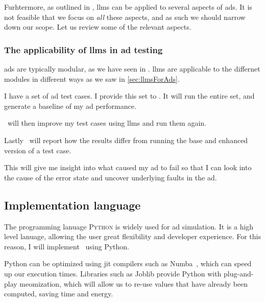 Furhtermore, as outlined in \citeauthor{LLM4AD}, \acrlong{llms} can be applied to several aspects
of \acrlong{ads}. It is not feasible that we focus on \textit{all} these aspects, and as such we
should narrow down our scope. Let us review some of the relevant aspects.

\subsubsection*{The applicability of \acrshort{llms} in \acrshort{ad} testing}

\acrlong{ads} are typically modular, as we have seen in .
\acrshort{llms} are applicable to the differnet modules in different ways as we saw in \cref{sec:llmsForAds}.

\begin{tcolorbox}[colback=gray!5!white,colframe=gray!75!black,title=User history
        of using \hefe]\label{user-history}
    I have a set of \acrfull{ad} test cases. I provide this set to \hefe. It will run the entire
    set, and generate a baseline of my \acrshort{ad} performance.

    \hefe~will then improve my test cases using \acrlong{llms} and run them again.

    Lastly \hefe~will report how the results differ from running the base and enhanced version of a
    test case.

    This will give me insight into what caused my \acrshort{ad} to fail so that I can look into the
    cause of the error state and uncover underlying faults in the \acrlong{ad}.

\end{tcolorbox}


\subsection{Implementation language}

The programming lanuage \textsc{Python} is widely used for \acrfull{ad} simulation. It is a high
level lanuage, allowing the user great flexibility and developer experience. For this reason, I will
implement \hefe~using Python.

Python can be optimized using \acrfull{jit} compilers such as Numba~\cite{numba}, which can speed up
our execution times. Libraries such as Joblib provide Python with plug-and-play
meomization, which will allow us to re-use values that have already been
computed, saving time and energy.

